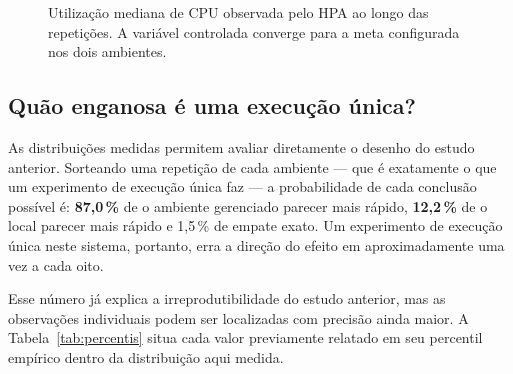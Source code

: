 \documentclass[conference]{IEEEtran}
\begin{document}
\begin{figure}[!t]
\centering
{}
\caption{Utilização mediana de CPU observada pelo HPA ao longo das repetições. A
variável controlada converge para a meta configurada nos dois ambientes.}
\label{fig:cpu}
\end{figure}

\subsection{Quão enganosa é uma execução única?}
\label{sec:execucao-unica}

As distribuições medidas permitem avaliar diretamente o desenho do estudo
anterior. Sorteando uma repetição de cada ambiente --- que é exatamente o que um
experimento de execução única faz --- a probabilidade de cada conclusão possível
é: \textbf{87,0\,\%} de o ambiente gerenciado parecer mais rápido,
\textbf{12,2\,\%} de o local parecer mais rápido e 1,5\,\% de empate exato. Um
experimento de execução única neste sistema, portanto, erra a direção do efeito
em aproximadamente uma vez a cada oito.

Esse número já explica a irreprodutibilidade do estudo anterior, mas as
observações individuais podem ser localizadas com precisão ainda maior. A
Tabela~\ref{tab:percentis} situa cada valor previamente relatado em seu percentil
empírico dentro da distribuição aqui medida.
\end{document}
